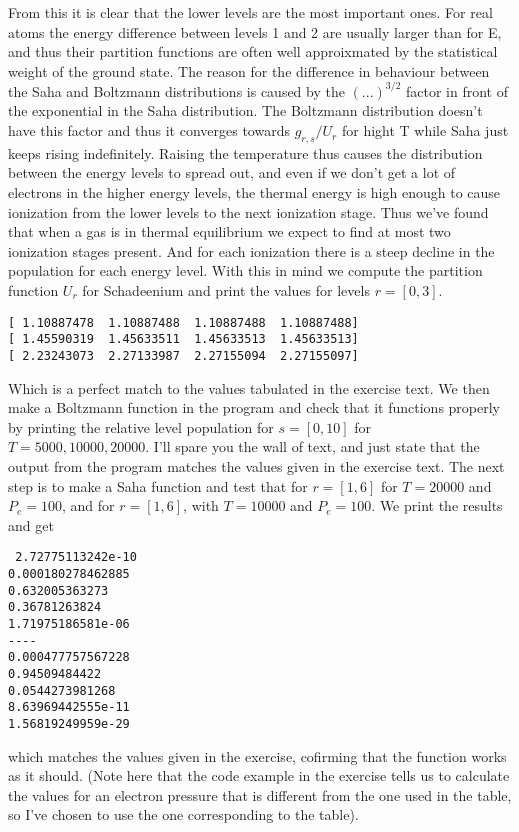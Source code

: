 \documentclass{aa}   %
\begin{document}
From this it is clear that the lower levels are the most important ones. For real atoms the energy difference between levels 1 and 2 are usually larger than for E, and thus their partition functions are often well approixmated by the statistical weight of the ground state.
The reason for the difference in behaviour between the Saha and Boltzmann distributions is caused by the $(...)^{3/2}$ factor in front of the exponential in the Saha distribution. The Boltzmann distribution doesn't have this factor and thus it converges towards $g_{r,s}/U_r$ for hight T while Saha just keeps rising indefinitely.
Raising the temperature thus causes the distribution between the energy levels to spread out, and even if we don't get a lot of electrons in the higher energy levels, the thermal energy is high enough to cause ionization from the lower levels to the next ionization stage.
Thus we've found that when a gas is in thermal equilibrium we expect to find at most two ionization stages present. And for each ionization there is a steep decline in the population for each energy level.
With this in mind we compute the partition function $U_r$ for Schadeenium and print the values for levels $r =[0,3]$.
\begin{verbatim}
[ 1.10887478  1.10887488  1.10887488  1.10887488]
[ 1.45590319  1.45633511  1.45633513  1.45633513]
[ 2.23243073  2.27133987  2.27155094  2.27155097]
\end{verbatim}
Which is a perfect match to the values tabulated in the exercise text.
We then make a Boltzmann function in the program and check that it functions properly by printing the relative level population for $s = [0,10]$ for $T = 5000,10000,20000$. I'll spare you the wall of text, and just state that the output from the program matches the values given in the exercise text.
The next step is to make a Saha function and test that for $r = [1,6]$ for $T = 20000$ and $P_e = 100$, and for $r = [1,6]$, with $T = 10000$ and $P_e = 100$. We print the results and get 
\begin{verbatim}
 2.72775113242e-10
0.000180278462885
0.632005363273
0.36781263824
1.71975186581e-06
----
0.000477757567228
0.94509484422
0.0544273981268
8.63969442555e-11
1.56819249959e-29
\end{verbatim}
which matches the values given in the exercise, cofirming that the function works as it should.
(Note here that the code example in the exercise tells us to calculate the values for an electron pressure that is different from the one used in the table, so I've chosen to use the one corresponding to the table).
\end{document}
